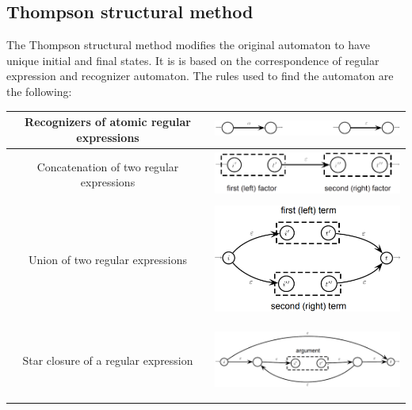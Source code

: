 \subsection*{Thompson structural method}
The Thompson structural method modifies the original automaton to have unique initial and final states.
It is is based on the correspondence of regular expression and recognizer automaton. 
The rules used to find the automaton are the following: 
\begin{table}[H]
    \centering
    \begin{tabular}{cc}
    \hline
    Recognizers of atomic regular expressions & \begin{minipage}{.4\textwidth}\centering\includegraphics[width=\linewidth, height=6mm]{images/t1.png}\end{minipage} \\ \hline
    Concatenation of two regular expressions  & \begin{minipage}{.4\textwidth}\centering\includegraphics[width=\linewidth, height=15mm]{images/t2.png}\end{minipage} \\ \hline
    Union of two regular expressions          & \begin{minipage}{.4\textwidth}\centering\includegraphics[width=\linewidth, height=37mm]{images/t3.png}\end{minipage} \\ \hline
    Star closure of a regular expression      & \begin{minipage}{.4\textwidth}\centering\includegraphics[width=\linewidth, height=25mm]{images/t4.png}\end{minipage} \\ \hline
    \end{tabular}
\end{table}
